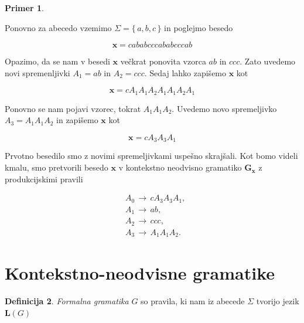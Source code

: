 \documentclass{amsart}
\theoremstyle{definition} %
\newtheorem{definicija}{Definicija}[section]
\newtheorem{primer}[definicija]{Primer}
\theoremstyle{plain} %
\begin{document}
\begin{primer}\label{p1}
    
    Ponovno za abecedo vzemimo $ \Sigma = \{\, a,b,c \,\} $ in poglejmo besedo

    \begin{equation*}
        \mathbf{x} = cababcccababcccab
    \end{equation*}

    Opazimo, da se nam v besedi $ \mathbf{x} $ večkrat ponovita vzorca $ ab $ in $ ccc $. Zato uvedemo
    novi spremenljivki $ A_1 = ab $ in $ A_2 = ccc $. Sedaj lahko zapišemo $ \mathbf{x} $ kot

    \begin{equation*}
        \mathbf{x} = cA_1A_1A_2A_1A_1A_2A_1
    \end{equation*}

    Ponovno se nam pojavi vzorec, tokrat $ A_1A_1A_2 $. Uvedemo novo spremeljivko $ A_3 = A_1A_1A_2 $
    in zapišemo $ \mathbf{x} $ kot

    \begin{equation*}
        \mathbf{x} = cA_3A_3A_1
    \end{equation*}
    
    Prvotno besedilo smo z novimi spremeljivkami uspešno skrajšali. Kot bomo videli kmalu, smo
    pretvorili besedo $ \mathbf{x} $ v kontekstno neodvisno gramatiko $ \mathbf{G_x} $ z 
    produkcijskimi pravili

    \begin{align*}
        & A_0 \, \rightarrow \, cA_3A_3A_1, \\
        & A_1 \, \rightarrow \, ab, \\
        & A_2 \, \rightarrow \, ccc, \\
        & A_3 \, \rightarrow \, A_1A_1A_2.
    \end{align*}

\end{primer}

\section{Kontekstno-neodvisne gramatike}



\begin{definicija}

    \textit{Formalna gramatika} $ G $ so pravila, ki nam iz abecede $ \Sigma $ tvorijo jezik
    $ \mathbf{L}(G) $

\end{definicija}
\end{document}
